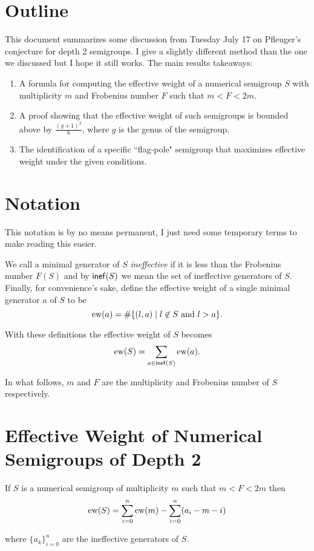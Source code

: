 \documentclass[11pt]{article}
\title{}
\author{Erik Imathiu-Jones}
\begin{document}
\section{Outline}
\begin{tcolorbox}[title=TLDR]
    This document summarizes some discussion from Tuesday July 17 on Pfleuger's conjecture for depth 2 semigroups. I give a slightly different method than the one we discussed but I hope it still works. The main results takeaways:
\begin{enumerate}
    \item A formula for computing the effective weight of a numerical semigroup \(S\) with multiplicity \(m\) and Frobenius number \(F\) such that \(m < F < 2m\).
    \item A proof showing that the effective weight of such semigroups is bounded above by \(\frac{(g+1)^2}{8}\), where \(g\) is the genus of the semigroup.
    \item The identification of a specific ``flag-pole" semigroup that maximizes effective weight under the given conditions.
\end{enumerate}
\end{tcolorbox}
\section{Notation}

This notation is by no means permanent, I just need some temporary terms to make reading this easier.


We call a minimal generator of \(S\) \emph{ineffective} if it is less than the Frobenius number \(F(S)\) and by \(\mathsf{inef}(S)\) we mean the set of ineffective generators of \(S\). Finally, for convenience's sake, define the effective weight of a single minimal generator \(a\) of \(S\) to be 
\[
\text{ew}(a) = \#\{(l, a) \mid l \not\in S \text{ and } l > a\}.
\]

With these definitions the effective weight of \(S\) becomes \[\text{ew}(S) = \sum\limits_{a \in \mathsf{inef}(S)} \text{ew}(a).\]

In what follows, \(m\) and \(F\) are the multiplicity and Frobenius number of \(S\) respectively.

\newpage
\section{Effective Weight of Numerical Semigroups of Depth 2}

\begin{proposition}
    If \(S\) is a numerical semigroup of multiplicity \(m\) such that \(m < F < 2 m\) then 
    \[\text{ew}(S) = \sum\limits_{i = 0}^n \text{ew}(m) - \sum\limits_{i = 0}^n (a_i - m - i)\]

    where \(\{a_k\}_{i=0}^n\) are the ineffective generators of \(S\).
\end{proposition}
\end{document}
